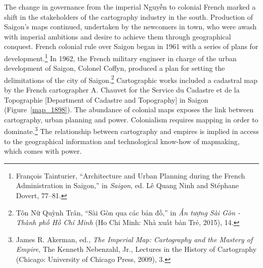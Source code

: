 \vi
The change in governance from the imperial Nguyễn to colonial French marked a shift in the stakeholders of the cartography industry in the south. Production of Saigon’s maps continued, undertaken by the newcomers in town, who were awash with imperial ambitions and desire to achieve them through geographical conquest. French colonial rule over Saigon began in 1961 with a series of plans for development.\footnote{François Tainturier, “Architecture and Urban Planning during the French Administration in Saigon,” in \textit{Saigon}, ed. Lê Quang Ninh and Stéphane Dovert, 77–81.} In 1962, the French military engineer in charge of the urban development of Saigon, Colonel Coffyn, produced a plan for setting the delimitations of the city of Saigon.\footnote{Tôn Nữ Quỳnh Trân, “Sài Gòn qua các bản đồ,” in \textit{Ấn tượng Sài Gòn - Thành phố Hồ Chí Minh} (Ho Chi Minh: Nhà xuất bản Trẻ, 2015), 14.} Cartographic works included a cadastral map by the French cartographer A. Chauvet for the Service du Cadastre et de la Topographie [Department of Cadastre and Topography] in Saigon (Figure~\ref{map_1898}). The abundance of colonial maps exposes the link between cartography, urban planning and power. Colonialism requires mapping in order to dominate.\footnote{James R. Akerman, ed., \textit{The Imperial Map: Cartography and the Mastery of Empire}, The Kenneth Nebenzahl, Jr., Lectures in the History of Cartography (Chicago: University of Chicago Press, 2009), 3.} The relationship between cartography and empires is implied in access to the geographical information and technological know-how of mapmaking, which comes with power.

\en
\begin{figure}[!ht]
\vspace{-.2 in}
\end{figure}

